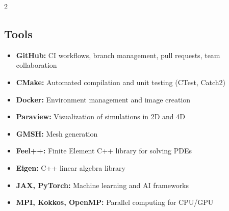 \documentclass[lighthipster]{latex_for_CV/simplehipstercv}
\begin{document}
\begin{paracol}{2}
\subsection*{\small Tools}
\setlength{\itemsep}{-0.35em}
\begin{itemize} 
    \item \textbf{GitHub:} CI workflows, branch management, pull requests, team collaboration \\[-0.4cm]
    \item \textbf{CMake:} Automated compilation and unit testing (CTest, Catch2) \\[-0.4cm]
    \item \textbf{Docker:} Environment management and image creation \\[-0.4cm]
    \item \textbf{Paraview:} Visualization of simulations in 2D and 4D \\[-0.4cm]
    \item \textbf{GMSH:} Mesh generation \\[-0.4cm]
    \item \textbf{Feel++:} Finite Element C++ library for solving PDEs \\[-0.4cm]
    \item \textbf{Eigen:} C++ linear algebra library \\[-0.4cm]
    \item \textbf{JAX, PyTorch:} Machine learning and AI frameworks \\[-0.4cm]
    \item \textbf{MPI, Kokkos, OpenMP:} Parallel computing for CPU/GPU
\end{itemize}









\end{paracol}
\end{document}
